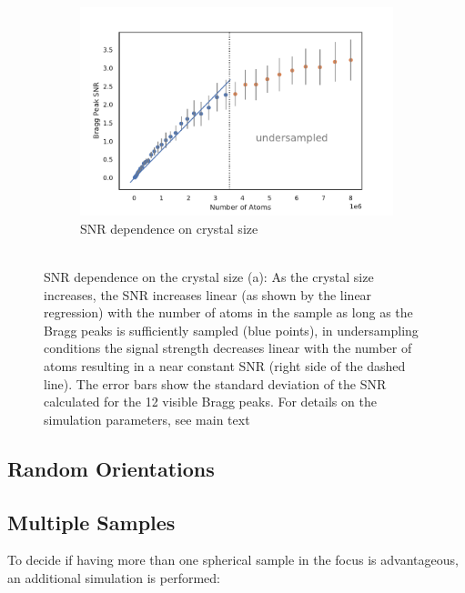 \begin{figure}
	\centering
	\begin{subfigure}[b]{0.48\textwidth}
		\includegraphics[width=\linewidth]{images/SNRNatoms.pdf}
		\caption{ SNR dependence on crystal size\\$ $}
		\label{fig:SNRNatoms}
	\end{subfigure}
	\begin{subfigure}[b]{0.32\textwidth}
	\end{subfigure}
\caption{SNR dependence on the crystal size (a): As the crystal size increases, the SNR increases linear (as shown by the linear regression) with the number of atoms in the sample as long as the Bragg peaks is sufficiently sampled (blue points), in undersampling conditions the signal strength decreases linear with the number of atoms resulting in a near constant SNR (right side of the dashed line). The error bars show the standard deviation of the SNR calculated for the 12 visible Bragg peaks. For details on the simulation parameters, see main text}

\end{figure}


\subsection{Random Orientations}

\subsection{Multiple Samples}
To decide if having more than one spherical sample in the focus is advantageous, an additional simulation is performed:
 
